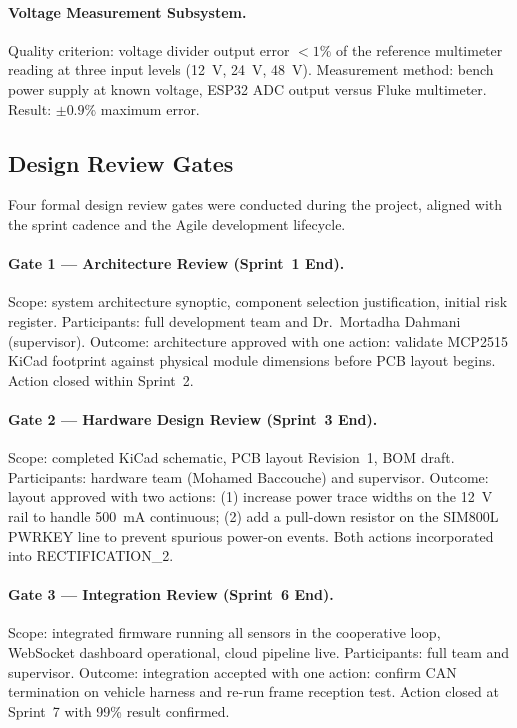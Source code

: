 \paragraph{Voltage Measurement Subsystem.}
Quality criterion: voltage divider output error $< 1\%$ of the reference multimeter reading at three input levels (12~V, 24~V, 48~V). Measurement method: bench power supply at known voltage, ESP32 ADC output versus Fluke multimeter. Result: $\pm 0.9\%$ maximum error.

\subsection{Design Review Gates}

Four formal design review gates were conducted during the project, aligned with the sprint cadence and the Agile development lifecycle.

\paragraph{Gate 1 --- Architecture Review (Sprint~1 End).}
Scope: system architecture synoptic, component selection justification, initial risk register. Participants: full development team and Dr.\ Mortadha Dahmani (supervisor). Outcome: architecture approved with one action: validate MCP2515 KiCad footprint against physical module dimensions before PCB layout begins. Action closed within Sprint~2.

\paragraph{Gate 2 --- Hardware Design Review (Sprint~3 End).}
Scope: completed KiCad schematic, PCB layout Revision~1, BOM draft. Participants: hardware team (Mohamed Baccouche) and supervisor. Outcome: layout approved with two actions: (1) increase power trace widths on the 12~V rail to handle 500~mA continuous; (2) add a pull-down resistor on the SIM800L PWRKEY line to prevent spurious power-on events. Both actions incorporated into RECTIFICATION\_2.

\paragraph{Gate 3 --- Integration Review (Sprint~6 End).}
Scope: integrated firmware running all sensors in the cooperative loop, WebSocket dashboard operational, cloud pipeline live. Participants: full team and supervisor. Outcome: integration accepted with one action: confirm CAN termination on vehicle harness and re-run frame reception test. Action closed at Sprint~7 with 99\% result confirmed.


